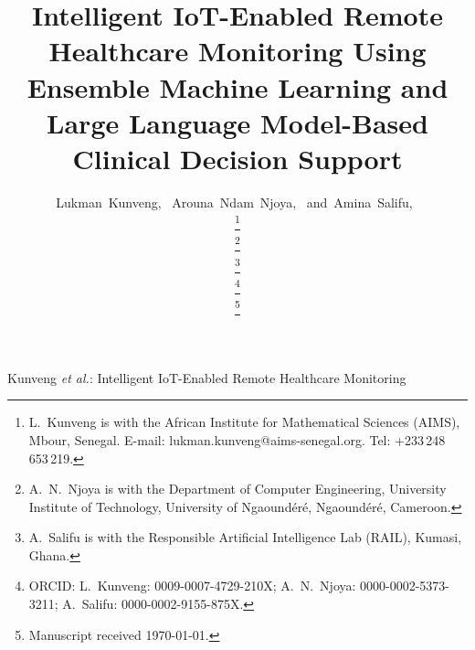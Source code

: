 \documentclass[journal]{IEEEtran}
\begin{document}
\title{Intelligent IoT-Enabled Remote Healthcare Monitoring Using Ensemble
       Machine Learning and Large Language Model-Based Clinical Decision Support}

\author{Lukman~Kunveng,~
        Arouna~Ndam~Njoya,~
        and~Amina~Salifu,~

\thanks{L.~Kunveng is with the African Institute for Mathematical Sciences
(AIMS), Mbour, Senegal. E-mail: lukman.kunveng@aims-senegal.org.
Tel: +233\,248\,653\,219.}

\thanks{A.~N.~Njoya is with the Department of Computer Engineering,
University Institute of Technology, University of Ngaound\'{e}r\'{e},
Ngaound\'{e}r\'{e}, Cameroon.}

\thanks{A.~Salifu is with the Responsible Artificial Intelligence Lab
(RAIL), Kumasi, Ghana.}

\thanks{ORCID: L.~Kunveng: 0009-0007-4729-210X;\;
A.~N.~Njoya: 0000-0002-5373-3211;\;
A.~Salifu: 0000-0002-9155-875X.}

\thanks{Manuscript received \today.}}

%
{Kunveng \MakeLowercase{\textit{et al.}}: Intelligent IoT-Enabled Remote Healthcare Monitoring}

\maketitle
\end{document}
